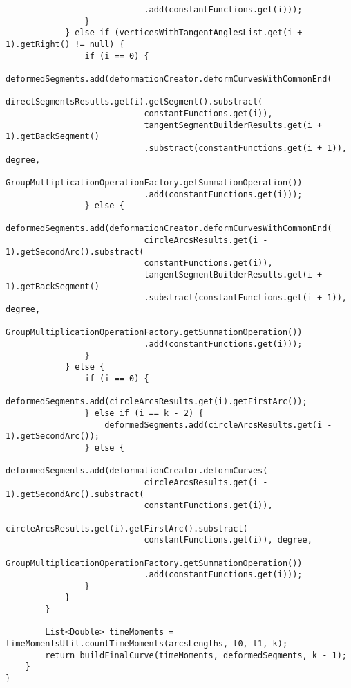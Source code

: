 \begin{verbatim}
                            .add(constantFunctions.get(i)));
                }
            } else if (verticesWithTangentAnglesList.get(i + 1).getRight() != null) {
                if (i == 0) {
                    deformedSegments.add(deformationCreator.deformCurvesWithCommonEnd(
                            directSegmentsResults.get(i).getSegment().substract(
                            constantFunctions.get(i)),
                            tangentSegmentBuilderResults.get(i + 1).getBackSegment()
                            .substract(constantFunctions.get(i + 1)), degree,
                            GroupMultiplicationOperationFactory.getSummationOperation())
                            .add(constantFunctions.get(i)));
                } else {
                    deformedSegments.add(deformationCreator.deformCurvesWithCommonEnd(
                            circleArcsResults.get(i - 1).getSecondArc().substract(
                            constantFunctions.get(i)),
                            tangentSegmentBuilderResults.get(i + 1).getBackSegment()
                            .substract(constantFunctions.get(i + 1)), degree,
                            GroupMultiplicationOperationFactory.getSummationOperation())
                            .add(constantFunctions.get(i)));
                }
            } else {
                if (i == 0) {
                    deformedSegments.add(circleArcsResults.get(i).getFirstArc());
                } else if (i == k - 2) {
                    deformedSegments.add(circleArcsResults.get(i - 1).getSecondArc());
                } else {
                    deformedSegments.add(deformationCreator.deformCurves(
                            circleArcsResults.get(i - 1).getSecondArc().substract(
                            constantFunctions.get(i)),
                            circleArcsResults.get(i).getFirstArc().substract(
                            constantFunctions.get(i)), degree,
                            GroupMultiplicationOperationFactory.getSummationOperation())
                            .add(constantFunctions.get(i)));
                }
            }
        }

        List<Double> timeMoments = timeMomentsUtil.countTimeMoments(arcsLengths, t0, t1, k);
        return buildFinalCurve(timeMoments, deformedSegments, k - 1);
    }
}
\end{verbatim}
